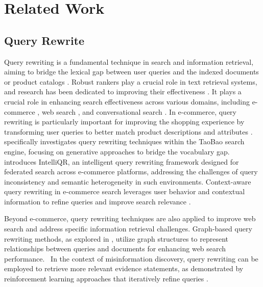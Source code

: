 \section{Related Work}
\subsection{Query Rewrite}

Query rewriting is a fundamental technique in search and information retrieval, aiming to bridge the lexical gap between user queries and the indexed documents or product catalogs \cite{TaoBaoQR2022}.  Robust rankers play a crucial role in text retrieval systems, and research has been dedicated to improving their effectiveness \cite{zhou2023towards}.  It plays a crucial role in enhancing search effectiveness across various domains, including e-commerce \cite{TaoBaoQR2022, ContextAwareQR2023}, web search \cite{GraphBasedQR2007}, and conversational search \cite{SimpleMultiQR2024}. In e-commerce, query rewriting is particularly important for improving the shopping experience by transforming user queries to better match product descriptions and attributes \cite{TaoBaoQR2022, IntelliQR2024, ContextAwareQR2023}. \cite{TaoBaoQR2022} specifically investigates query rewriting techniques within the TaoBao search engine, focusing on generative approaches to bridge the vocabulary gap. \cite{IntelliQR2024} introduces IntelliQR, an intelligent query rewriting framework designed for federated search across e-commerce platforms, addressing the challenges of query inconsistency and semantic heterogeneity in such environments. Context-aware query rewriting in e-commerce search leverages user behavior and contextual information to refine queries and improve search relevance \cite{ContextAwareQR2023}.

Beyond e-commerce, query rewriting techniques are also applied to improve web search and address specific information retrieval challenges. Graph-based query rewriting methods, as explored in \cite{GraphBasedQR2007}, utilize graph structures to represent relationships between queries and documents for enhancing web search performance.  In the context of misinformation discovery, query rewriting can be employed to retrieve more relevant evidence statements, as demonstrated by reinforcement learning approaches that iteratively refine queries \cite{MisinfoQR2023}.

